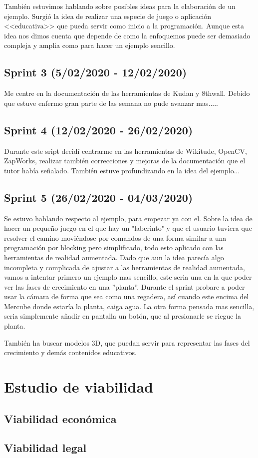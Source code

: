 También estuvimos hablando sobre posibles ideas para la elaboración de un ejemplo. Surgió la idea de realizar una especie de juego o aplicación <<educativa>> que pueda servir como inicio a la programación. Aunque esta idea nos dimos cuenta que depende de como la enfoquemos puede ser demasiado compleja y amplia como para hacer un ejemplo sencillo.
\subsection{Sprint 3 (5/02/2020 - 12/02/2020)}

Me centre en la documentación de las herramientas de Kudan y 8thwall.
Debido que estuve enfermo gran parte de las semana no pude avanzar mas.....
\subsection{Sprint 4 (12/02/2020 - 26/02/2020)}
Durante este sript decidí centrarme en las herramientas de Wikitude, OpenCV, ZapWorks, realizar también correcciones y mejoras de la documentación que el tutor había señalado.
También estuve profundizando en la idea del ejemplo... 
\subsection{Sprint 5 (26/02/2020 - 04/03/2020)}
Se estuvo hablando respecto al ejemplo, para empezar ya con el. Sobre la idea de hacer un pequeño juego en el que hay un "laberinto" y que el usuario tuviera que resolver el camino moviéndose por comandos de una forma similar a una programación por blocking pero simplificado, todo esto aplicado con las herramientas de realidad aumentada. Dado que aun la idea parecía algo incompleta y complicada de ajustar a las herramientas de realidad aumentada, vamos a intentar primero un ejemplo mas sencillo, este seria una en la que poder ver las fases de crecimiento en una ''planta''. 
Durante el sprint probare a poder usar la cámara de forma que sea como una regadera, así cuando este encima del Mercube donde estaría la planta, caiga agua. La otra forma pensada mas sencilla, seria simplemente añadir en pantalla un botón, que al presionarle se riegue la planta.

También ha buscar modelos 3D, que puedan servir para representar las fases del crecimiento y demás contenidos educativos.

\section{Estudio de viabilidad}

\subsection{Viabilidad económica}

\subsection{Viabilidad legal}


